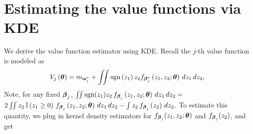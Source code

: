 \section{Estimating the value functions via KDE}
We derive the value function estimator using KDE. Recall the $j$-th value function is modeled as $$V_j\left(\boldsymbol{\theta}\right) = m_{\boldsymbol{\alpha}^*_j}+ \iint \text{sgn}\left(z_1\right)z_2 f_{\boldsymbol{\beta}^*_j}\left(z_1, z_2; \boldsymbol{\theta}\right) \,dz_1 \,dz_2,$$ 
Note, for any fixed $\boldsymbol{\beta}_j$, {\small$\iint\text{sgn}(z_1)z_2\,f_{\boldsymbol{\beta}_j}\left(z_1,z_2;\boldsymbol{\theta}\right)\,dz_1\,dz_2 =$\\$2\iint z_2\,\mathbb{I}\left(z_1\ge0\right)\,f_{\boldsymbol{\beta}_j}\left(z_1, z_2;\boldsymbol{\theta}\right)\,dz_1\,dz_2-\int z_2\,f_{\boldsymbol{\beta}_{j}}\left(z_2\right)\,dz_2.$} To estimate this quantity, we plug in kernel density estimators for $f_{\boldsymbol{\beta}_j}(z_1, z_2; \boldsymbol{\theta})$
and $f_{\boldsymbol{\beta}_j}( z_2 )$, and get

